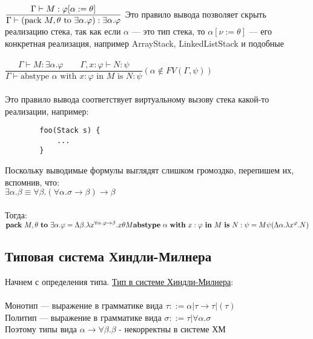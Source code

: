 	
 	$\dfrac{\Gamma \vdash M : \varphi[\alpha := \theta]}{\Gamma\vdash (\text{pack } M, \theta \text{ to } \exists \alpha . \varphi) : \exists \alpha.\varphi}\\ \\ \\
	$ Это правило вывода позволяет скрыть реализацию стека, так как если $\alpha$ — это тип стека, то $\alpha[\nu := \theta]$ — его конкретная реализация, например ArrayStack, LinkedListStack и подобные \\ \\
 	 $
 	\dfrac{\Gamma \vdash M : \exists \alpha . \varphi\qquad\Gamma, x : \varphi \vdash N : \psi}{\Gamma \vdash \text{abstype } \alpha \text{ with } x:\varphi \text{ in } M \text{ is } N:\psi}
	(\alpha \notin FV(\Gamma, \psi))$
	\\ \\
	Это правило вывода соответствует виртуальному вызову стека какой-то реализации, например: 
	\begin{verbatim}
		foo(Stack s) {
			...
		}
	\end{verbatim}
	Поскольку выводимые формулы выглядят слишком громоздко, перепишем их, вспомнив, что: \\
	$\exists\alpha.\beta\equiv\forall\beta.(\forall\alpha.\sigma\rightarrow\beta)\rightarrow\beta$\\\\
	Тогда: \\
	$	\text{\textbf{pack} } M, \theta \text{ \textbf{to} } \exists \alpha . \varphi =
		\Lambda \beta . \lambda x^{\forall \alpha . \varphi \to \beta} . x \theta M \\
		\text{\textbf{abstype} } \alpha \text{ \textbf{with} } x:\varphi \text{ \textbf{in} } M \text{ \textbf{is} } N:\psi =
		M \psi (\Lambda \alpha . \lambda x ^ \varphi . N)
	$
	
	 \subsection{Типовая система Хиндли-Милнера}
	   
	 Начнем с определения типа. \underline{Тип в системе Хиндли-Милнера}: \\ \\
	 Монотип — выражение в грамматике вида $\tau::=\alpha|\tau\rightarrow\tau|(\tau)$\\
	 Политип — выражение в грамматике вида $\sigma::=\tau|\forall\alpha.\sigma$\\
	 
	 \noindent Поэтому типы вида $\alpha\rightarrow\forall\beta.\beta$ - некорректны в системе ХМ\\
	 
